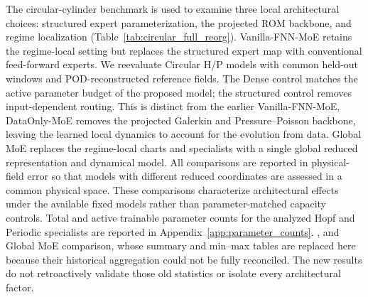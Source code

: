 \documentclass{article}
\providecommand{\DIFaddtex}[1]{{\protect\color{blue} \sf #1}} %
\providecommand{\DIFdeltex}[1]{{\protect\color{red} \scriptsize #1}} %
\providecommand{\DIFaddbegin}{} %
\providecommand{\DIFaddend}{} %
\providecommand{\DIFdelbegin}{} %
\providecommand{\DIFdelend}{} %
\providecommand{\DIFadd}[1]{\texorpdfstring{\DIFaddtex{#1}}{#1}} %
\providecommand{\DIFdel}[1]{\texorpdfstring{\DIFdeltex{#1}}{}} %
\begin{document}
\DIFdel{The circular-cylinder benchmark is used to examine three local architectural choices: structured expert parameterization, the projected ROM backbone, and regime localization (Table~\ref{tab:circular_full_reorg}). Vanilla-FNN-MoE retains the
regime-local setting but replaces the structured expert map with conventional feed-forward experts. }\DIFdelend \DIFaddbegin \DIFadd{We reevaluate Circular H/P models with common held-out windows and
POD-reconstructed reference fields. The Dense control matches the active
parameter budget of the proposed model; the structured control removes
input-dependent routing. This is distinct from the earlier
Vanilla-FNN-MoE, }\DIFaddend DataOnly-MoE\DIFdelbegin \DIFdel{removes the projected Galerkin and Pressure--Poisson backbone, leaving the learned local dynamics to account for the evolution from data. Global MoE replaces the regime-local charts and specialists with a single global reduced representation and dynamical model. All comparisons are reported in physical-field error so that models with different reduced coordinates are assessed in a common physical space. These comparisons characterize architectural effects under the available fixed models rather than parameter-matched capacity controls.
Total and active trainable parameter counts for the analyzed Hopf and Periodic specialists are reported in Appendix~\ref{app:parameter_counts}.
}\DIFdelend \DIFaddbegin \DIFadd{, and Global MoE comparison, whose summary and
min--max tables are replaced here because their historical aggregation
could not be fully reconciled. The new results do not retroactively
validate those old statistics or isolate every architectural factor.
}\DIFaddend 
\end{document}
